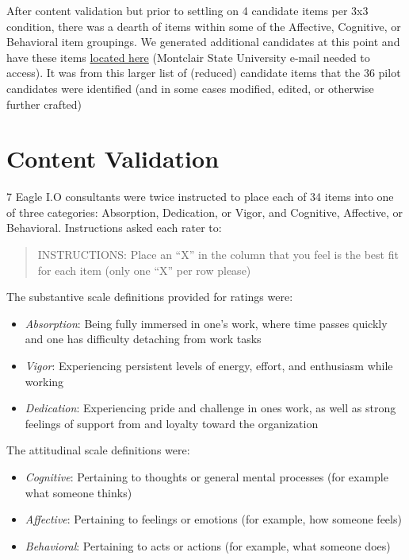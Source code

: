 \documentclass[
]{book}
\providecommand{\tightlist}{%
  \setlength{\itemsep}{0pt}\setlength{\parskip}{0pt}}
\begin{document}
After content validation but prior to settling on 4 candidate items per 3x3 condition, there was a dearth of items within some of the Affective, Cognitive, or Behavioral item groupings. We generated additional candidates at this point and have these items \href{https://docs.google.com/document/d/1whB4Ve4aDDl3bxx3dIlloouTDy1ScCcxrT3gK6s9DyU/edit?usp=sharing}{located here} (Montclair State University e-mail needed to access). It was from this larger list of (reduced) candidate items that the 36 pilot candidates were identified (and in some cases modified, edited, or otherwise further crafted)

\hypertarget{CValid}{%
\section{Content Validation}\label{CValid}}

7 Eagle I.O consultants were twice instructed to place each of 34 items into one of three categories: Absorption, Dedication, or Vigor, and Cognitive, Affective, or Behavioral. Instructions asked each rater to:

\begin{quote}
INSTRUCTIONS: Place an ``X'' in the column that you feel is the best fit for each item (only one ``X'' per row please)
\end{quote}

The substantive scale definitions provided for ratings were:

\begin{itemize}
\tightlist
\item
  \emph{Absorption}: Being fully immersed in one's work, where time passes quickly and one has difficulty detaching from work tasks
\item
  \emph{Vigor}: Experiencing persistent levels of energy, effort, and enthusiasm while working
\item
  \emph{Dedication}: Experiencing pride and challenge in ones work, as well as strong feelings of support from and loyalty toward the organization
\end{itemize}

The attitudinal scale definitions were:

\begin{itemize}
\tightlist
\item
  \emph{Cognitive}: Pertaining to thoughts or general mental processes (for example what someone thinks)
\item
  \emph{Affective}: Pertaining to feelings or emotions (for example, how someone feels)
\item
  \emph{Behavioral}: Pertaining to acts or actions (for example, what someone does)
\end{itemize}
\end{document}
